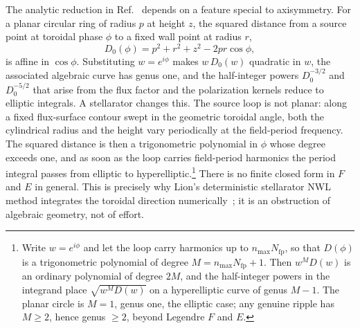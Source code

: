 \documentclass[11pt]{article}
\newcommand{\Nfp}{N_{\mathrm{fp}}}
\begin{document}
The analytic reduction in Ref.~\cite{schwartz2025} depends on a feature special to axisymmetry. For a planar circular ring of radius $p$ at height $z$, the squared distance from a source point at toroidal phase $\phi$ to a fixed wall point at radius $r$,
\begin{equation}
D_0(\phi)=p^2+r^2+z^2-2pr\cos\phi,
\label{eq:D0}
\end{equation}
is affine in $\cos\phi$. Substituting $w=e^{i\phi}$ makes $w\,D_0(w)$ quadratic in $w$, the associated algebraic curve has genus one, and the half-integer powers $D_0^{-3/2}$ and $D_0^{-5/2}$ that arise from the flux factor and the polarization kernels reduce to elliptic integrals. A stellarator changes this. The source loop is not planar: along a fixed flux-surface contour swept in the geometric toroidal angle, both the cylindrical radius and the height vary periodically at the field-period frequency. The squared distance is then a trigonometric polynomial in $\phi$ whose degree exceeds one, and as soon as the loop carries field-period harmonics the period integral passes from elliptic to hyperelliptic.\footnote{Write $w=e^{i\phi}$ and let the loop carry harmonics up to $n_{\max}\Nfp$, so that $D(\phi)$ is a trigonometric polynomial of degree $M=n_{\max}\Nfp+1$. Then $w^{M}D(w)$ is an ordinary polynomial of degree $2M$, and the half-integer powers in the integrand place $\sqrt{w^{M}D(w)}$ on a hyperelliptic curve of genus $M-1$. The planar circle is $M=1$, genus one, the elliptic case; any genuine ripple has $M\ge2$, hence genus $\ge2$, beyond Legendre $F$ and $E$.} There is no finite closed form in $F$ and $E$ in general. This is precisely why Lion's deterministic stellarator NWL method integrates the toroidal direction numerically~\cite{lion2022}; it is an obstruction of algebraic geometry, not of effort.
\end{document}
